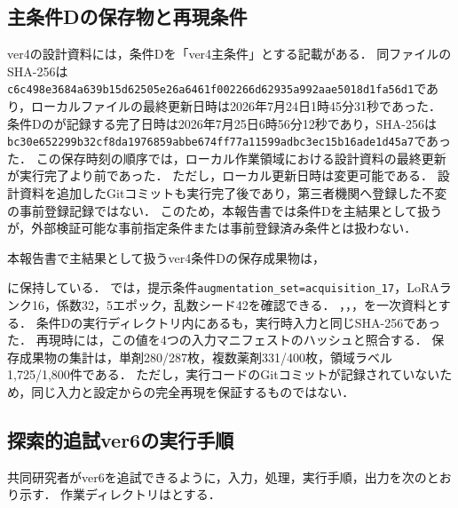 \documentclass[uplatex,dvipdfmx]{jsarticle}
\begin{document}
\subsection{主条件Dの保存物と再現条件}\label{sec:appendix_primary_d}

ver4の設計資料には，条件Dを「ver4主条件」とする記載がある．
同ファイルのSHA-256は\texttt{c6c498e3684a639b15d62505e26a6461}\allowbreak\texttt{f002266d62935a992aae5018d1fa56d1}であり，ローカルファイルの最終更新日時は2026年7月24日1時45分31秒であった．
条件Dのが記録する完了日時は2026年7月25日6時56分12秒であり，SHA-256は\texttt{bc30e652299b32cf8da1976859abbe674}\allowbreak\texttt{ff77a11599adbc3ec15b16ade1d45a7}であった．
この保存時刻の順序では，ローカル作業領域における設計資料の最終更新が実行完了より前であった．
ただし，ローカル更新日時は変更可能である．
設計資料を追加したGitコミットも実行完了後であり，第三者機関へ登録した不変の事前登録記録ではない．
このため，本報告書では条件Dを主結果として扱うが，外部検証可能な事前指定条件または事前登録済み条件とは扱わない．

本報告書で主結果として扱うver4条件Dの保存成果物は，
\begin{sloppypar}
\end{sloppypar}
に保持している．
では，提示条件\texttt{augmentation\_set=acquisition\_17}，LoRAランク16，係数32，5エポック，乱数シード42を確認できる．
，，，を一次資料とする．
条件Dの実行ディレクトリ内にあるも，実行時入力と同じSHA-256であった．
再現時には，この値を4つの入力マニフェストのハッシュと照合する．
保存成果物の集計は，単剤280/287枚，複数薬剤331/400枚，領域ラベル1,725/1,800件である．
ただし，実行コードのGitコミットが記録されていないため，同じ入力と設定からの完全再現を保証するものではない．

\subsection{探索的追試ver6の実行手順}

共同研究者がver6を追試できるように，入力，処理，実行手順，出力を次のとおり示す．
作業ディレクトリはとする．
\end{document}
